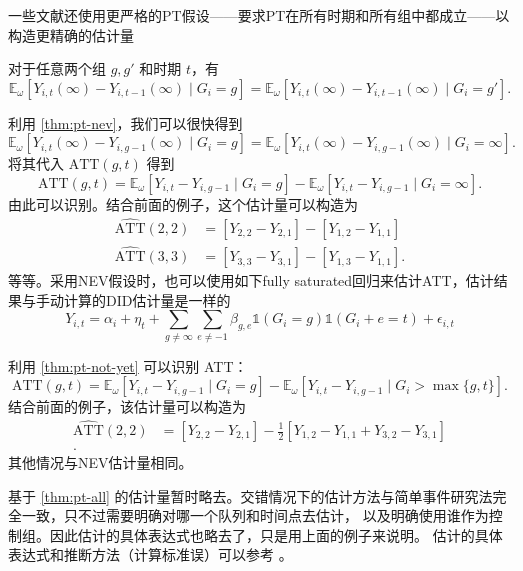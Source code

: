 \documentclass[../didNotes.tex]{subfiles}
\begin{document}
一些文献还使用更严格的PT假设——要求PT在所有时期和所有组中都成立——以构造更精确的估计量
\begin{assumption}\label{thm:pt-all}
  对于任意两个组 \( g,g' \) 和时期 \( t \)，有
  \[
    \mathbb{E}_{\omega}[Y_{i,t}(\infty)-Y_{i,t-1}(\infty) \mid G_i=g] =
    \mathbb{E}_{\omega}[Y_{i,t}(\infty)-Y_{i,t-1}(\infty) \mid G_i=g']
  .\]
\end{assumption}

利用 \autoref{thm:pt-nev}，我们可以很快得到
\[
  \mathbb{E}_{\omega}[Y_{i,t}(\infty)-Y_{i,g-1}(\infty) \mid G_i=g] =
  \mathbb{E}_{\omega}[Y_{i,t}(\infty)-Y_{i,g-1}(\infty) \mid G_i=\infty]
.\]
将其代入 \( \text{ATT}(g,t) \) 得到
\[
  \text{ATT}(g,t) = \mathbb{E}_{\omega}[Y_{i,t}-Y_{i,g-1} \mid G_i=g] -
  \mathbb{E}_{\omega}[Y_{i,t}-Y_{i,g-1} \mid G_i=\infty]
.\]
由此可以识别。结合前面的例子，这个估计量可以构造为
\begin{align*}
  \widehat{\text{ATT}}(2,2)&=[Y_{2,2}-Y_{2,1}] - [Y_{1,2}-Y_{1,1}] \\
  \widehat{\text{ATT}}(3,3)&=[Y_{3,3}-Y_{3,1}] - [Y_{1,3}-Y_{1,1}]
  .
\end{align*}
等等。采用NEV假设时，也可以使用如下fully saturated回归来估计ATT，估计结果与手动计算的DID估计量是一样的
$$
Y_{i,t} = \alpha_{i} + \eta_{t} + \sum_{g \neq \infty} \sum_{e \neq -1} \beta_{g,e} \mathbb{1} (G_{i}=g)
\mathbb{1}(G_{i}+e=t) + \epsilon_{i,t}
$$

利用 \autoref{thm:pt-not-yet} 可以识别 ATT：
\[
  \text{ATT}(g,t) = \mathbb{E}_{\omega}[Y_{i,t}-Y_{i,g-1} \mid G_i=g] -
  \mathbb{E}_{\omega}[Y_{i,t}-Y_{i,g-1} \mid G_i > \max \{g,t\} ]
.\]
结合前面的例子，该估计量可以构造为
\begin{align*}
  \widehat{\text{ATT}}(2,2) &= [Y_{2,2}-Y_{2,1}] - \frac{1}{2} [Y_{1,2}-Y_{1,1} +
  Y_{3,2}-Y_{3,1}] \\
  .
\end{align*}
其他情况与NEV估计量相同。

基于 \autoref{thm:pt-all} 的估计量暂时略去。交错情况下的估计方法与简单事件研究法完全一致，只不过需要明确对哪一个队列和时间点去估计，
以及明确使用谁作为控制组。因此估计的具体表达式也略去了，只是用上面的例子来说明。
估计的具体表达式和推断方法（计算标准误）可以参考 \textcite{callaway2021}。

\end{document}
